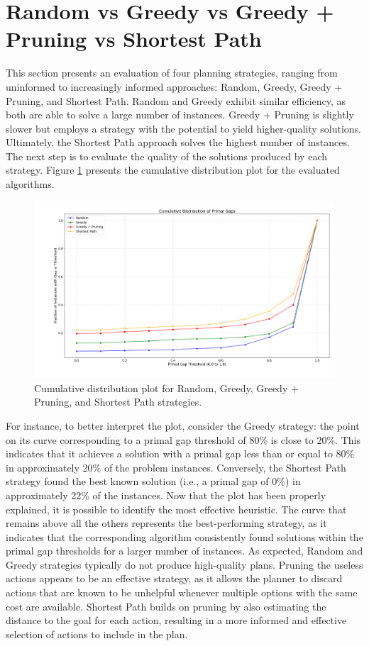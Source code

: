 \section{Random vs Greedy vs Greedy + Pruning vs Shortest Path}
This section presents an evaluation of four planning strategies, ranging from uninformed to increasingly informed approaches:
Random, Greedy, Greedy + Pruning, and Shortest Path.
Random and Greedy exhibit similar efficiency, as both are able to solve a large number of instances. Greedy + Pruning is
slightly slower but employs a strategy with the potential to yield higher-quality solutions. Ultimately, the Shortest Path approach
solves the highest number of instances. The next step is to evaluate the quality of the solutions produced by each strategy.
Figure \ref{fig:rgps} presents the cumulative distribution plot for the evaluated algorithms.

\begin{figure}[ht]
	\centering
	\includegraphics[width=\textwidth]{images/algs0124.png}
	\caption{Cumulative distribution plot for Random, Greedy, Greedy + Pruning, and Shortest Path strategies.}
	\label{fig:rgps}
\end{figure}

For instance, to better interpret the plot, consider the Greedy strategy: the point on its curve corresponding to
a primal gap threshold of 80\% is close to 20\%. This indicates that it achieves a solution with a primal gap less than
or equal to 80\% in approximately 20\% of the problem instances.
Conversely, the Shortest Path strategy found the best known solution (i.e., a primal gap of 0\%) in approximately
22\% of the instances.
Now that the plot has been properly explained, it is possible to identify the most effective heuristic.
The curve that remains above all the others represents the best-performing strategy, as it indicates that the corresponding
algorithm consistently found solutions within the primal gap thresholds for a larger number of instances.
As expected, Random and Greedy strategies typically do not produce high-quality plans. Pruning the useless actions appears to be
an effective strategy, as it allows the planner to discard actions that are known to be unhelpful whenever multiple
options with the same cost are available.
Shortest Path builds on pruning by also estimating the distance to the goal for each action, resulting in a more
informed and effective selection of actions to include in the plan.

